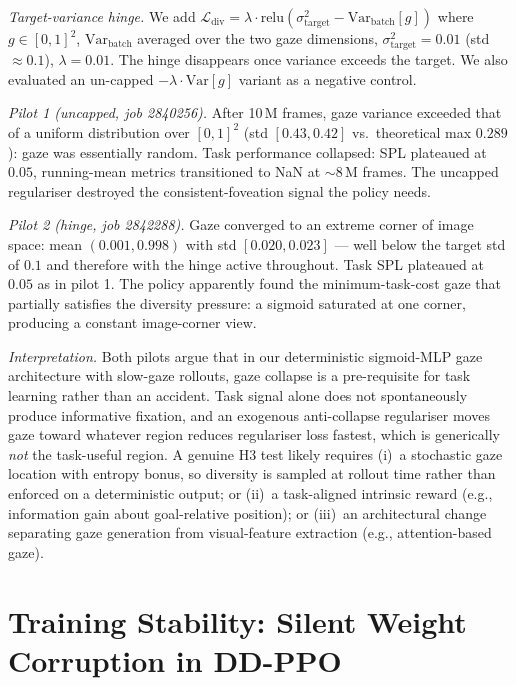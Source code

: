 \documentclass{article}
\begin{document}
\emph{Target-variance hinge.} We add $\mathcal{L}_\text{div} = \lambda \cdot \text{relu}(\sigma^2_\text{target} - \text{Var}_\text{batch}[g])$ where $g \in [0,1]^2$, $\text{Var}_\text{batch}$ averaged over the two gaze dimensions, $\sigma^2_\text{target}=0.01$ (std $\approx 0.1$), $\lambda = 0.01$. The hinge disappears once variance exceeds the target. We also evaluated an un-capped $-\lambda\cdot\text{Var}[g]$ variant as a negative control.

\emph{Pilot 1 (uncapped, job 2840256).} After 10\,M frames, gaze variance exceeded that of a uniform distribution over $[0,1]^2$ (std $[0.43, 0.42]$ vs.\ theoretical max $0.289$): gaze was essentially random. Task performance collapsed: SPL plateaued at $0.05$, running-mean metrics transitioned to NaN at $\sim 8$\,M frames. The uncapped regulariser destroyed the consistent-foveation signal the policy needs.

\emph{Pilot 2 (hinge, job 2842288).} Gaze converged to an extreme corner of image space: mean $(0.001, 0.998)$ with std $[0.020, 0.023]$ --- well below the target std of $0.1$ and therefore with the hinge active throughout. Task SPL plateaued at $0.05$ as in pilot 1. The policy apparently found the minimum-task-cost gaze that partially satisfies the diversity pressure: a sigmoid saturated at one corner, producing a constant image-corner view.

\emph{Interpretation.} Both pilots argue that in our deterministic sigmoid-MLP gaze architecture with slow-gaze rollouts, gaze collapse is a pre-requisite for task learning rather than an accident. Task signal alone does not spontaneously produce informative fixation, and an exogenous anti-collapse regulariser moves gaze toward whatever region reduces regulariser loss fastest, which is generically \emph{not} the task-useful region. A genuine H3 test likely requires (i)~a stochastic gaze location with entropy bonus, so diversity is sampled at rollout time rather than enforced on a deterministic output; or (ii)~a task-aligned intrinsic reward (e.g., information gain about goal-relative position); or (iii)~an architectural change separating gaze generation from visual-feature extraction (e.g., attention-based gaze).


\section{Training Stability: Silent Weight Corruption in DD-PPO}
\label{app:training-stability}
\end{document}
